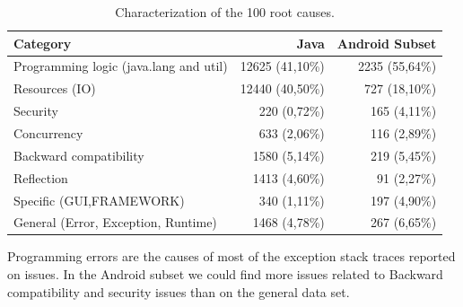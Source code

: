 \documentclass[conference]{IEEEtran}
\begin{document}
\begin{table}
  \centering
  \begin{tabular}{lrr}
    \hline
    \bfseries{Category} & \bfseries{Java} & \bfseries{Android Subset} \\
    \hline
      Programming logic (java.lang and util) & 12625  (41,10\%) & 2235 (55,64\%)\\
      Resources (IO)                         & 12440 (40,50\%)  & 727 (18,10\%) \\
      Security                               & 220  (0,72\%)    & 165 (4,11\%)\\
      Concurrency                            & 633 (2,06\%)     & 116  (2,89\%)\\
      Backward compatibility                 & 1580 (5,14\%)    & 219 (5,45\%) \\
      Reflection                             & 1413 (4,60\%)    & 91 (2,27\%)\\
      Specific (GUI,FRAMEWORK)               & 340 (1,11\%)     & 197 (4,90\%)\\
      General (Error, Exception, Runtime)    & 1468 (4,78\%)    & 267 (6,65\%)\\
    \hline
  \end{tabular}
  \caption{Characterization of the 100 root causes.}
  \label{tab:tophundrend}
\end{table}

Programming errors are the causes of most of the exception stack traces reported
on issues. In the Android subset we could find more issues related to Backward
compatibility and security issues than on the general data set.

\end{document}
